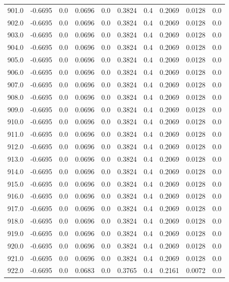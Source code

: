 \begin{longtable}{lrrrrrrrrr}
901.0 & -0.6695 & 0.0 & 0.0696 & 0.0 & 0.3824 & 0.4 & 0.2069 & 0.0128 & 0.0 \\
902.0 & -0.6695 & 0.0 & 0.0696 & 0.0 & 0.3824 & 0.4 & 0.2069 & 0.0128 & 0.0 \\
903.0 & -0.6695 & 0.0 & 0.0696 & 0.0 & 0.3824 & 0.4 & 0.2069 & 0.0128 & 0.0 \\
904.0 & -0.6695 & 0.0 & 0.0696 & 0.0 & 0.3824 & 0.4 & 0.2069 & 0.0128 & 0.0 \\
905.0 & -0.6695 & 0.0 & 0.0696 & 0.0 & 0.3824 & 0.4 & 0.2069 & 0.0128 & 0.0 \\
906.0 & -0.6695 & 0.0 & 0.0696 & 0.0 & 0.3824 & 0.4 & 0.2069 & 0.0128 & 0.0 \\
907.0 & -0.6695 & 0.0 & 0.0696 & 0.0 & 0.3824 & 0.4 & 0.2069 & 0.0128 & 0.0 \\
908.0 & -0.6695 & 0.0 & 0.0696 & 0.0 & 0.3824 & 0.4 & 0.2069 & 0.0128 & 0.0 \\
909.0 & -0.6695 & 0.0 & 0.0696 & 0.0 & 0.3824 & 0.4 & 0.2069 & 0.0128 & 0.0 \\
910.0 & -0.6695 & 0.0 & 0.0696 & 0.0 & 0.3824 & 0.4 & 0.2069 & 0.0128 & 0.0 \\
911.0 & -0.6695 & 0.0 & 0.0696 & 0.0 & 0.3824 & 0.4 & 0.2069 & 0.0128 & 0.0 \\
912.0 & -0.6695 & 0.0 & 0.0696 & 0.0 & 0.3824 & 0.4 & 0.2069 & 0.0128 & 0.0 \\
913.0 & -0.6695 & 0.0 & 0.0696 & 0.0 & 0.3824 & 0.4 & 0.2069 & 0.0128 & 0.0 \\
914.0 & -0.6695 & 0.0 & 0.0696 & 0.0 & 0.3824 & 0.4 & 0.2069 & 0.0128 & 0.0 \\
915.0 & -0.6695 & 0.0 & 0.0696 & 0.0 & 0.3824 & 0.4 & 0.2069 & 0.0128 & 0.0 \\
916.0 & -0.6695 & 0.0 & 0.0696 & 0.0 & 0.3824 & 0.4 & 0.2069 & 0.0128 & 0.0 \\
917.0 & -0.6695 & 0.0 & 0.0696 & 0.0 & 0.3824 & 0.4 & 0.2069 & 0.0128 & 0.0 \\
918.0 & -0.6695 & 0.0 & 0.0696 & 0.0 & 0.3824 & 0.4 & 0.2069 & 0.0128 & 0.0 \\
919.0 & -0.6695 & 0.0 & 0.0696 & 0.0 & 0.3824 & 0.4 & 0.2069 & 0.0128 & 0.0 \\
920.0 & -0.6695 & 0.0 & 0.0696 & 0.0 & 0.3824 & 0.4 & 0.2069 & 0.0128 & 0.0 \\
921.0 & -0.6695 & 0.0 & 0.0696 & 0.0 & 0.3824 & 0.4 & 0.2069 & 0.0128 & 0.0 \\
922.0 & -0.6695 & 0.0 & 0.0683 & 0.0 & 0.3765 & 0.4 & 0.2161 & 0.0072 & 0.0 \\

\end{longtable}
